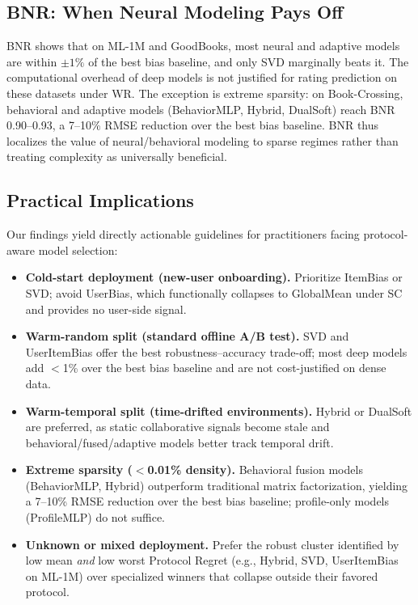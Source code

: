 \documentclass[journal]{IEEEtran}
\begin{document}
\subsection{BNR: When Neural Modeling Pays Off}
BNR shows that on ML-1M and GoodBooks, most neural and adaptive models are within $\pm1\%$ of the best bias baseline, and only SVD marginally beats it. The computational overhead of deep models is not justified for rating prediction on these datasets under WR. The exception is extreme sparsity: on Book-Crossing, behavioral and adaptive models (BehaviorMLP, Hybrid, DualSoft) reach BNR 0.90--0.93, a 7--10\% RMSE reduction over the best bias baseline. BNR thus localizes the value of neural/behavioral modeling to sparse regimes rather than treating complexity as universally beneficial.

\subsection{Practical Implications}
Our findings yield directly actionable guidelines for practitioners facing protocol-aware model selection:
\begin{itemize}
    \item \textbf{Cold-start deployment (new-user onboarding).} Prioritize ItemBias or SVD; avoid UserBias, which functionally collapses to GlobalMean under SC and provides no user-side signal.
    \item \textbf{Warm-random split (standard offline A/B test).} SVD and UserItemBias offer the best robustness--accuracy trade-off; most deep models add $<$1\% over the best bias baseline and are not cost-justified on dense data.
    \item \textbf{Warm-temporal split (time-drifted environments).} Hybrid or DualSoft are preferred, as static collaborative signals become stale and behavioral/fused/adaptive models better track temporal drift.
    \item \textbf{Extreme sparsity ($<$0.01\% density).} Behavioral fusion models (BehaviorMLP, Hybrid) outperform traditional matrix factorization, yielding a 7--10\% RMSE reduction over the best bias baseline; profile-only models (ProfileMLP) do not suffice.
    \item \textbf{Unknown or mixed deployment.} Prefer the robust cluster identified by low mean \emph{and} low worst Protocol Regret (e.g., Hybrid, SVD, UserItemBias on ML-1M) over specialized winners that collapse outside their favored protocol.
\end{itemize}
\end{document}

